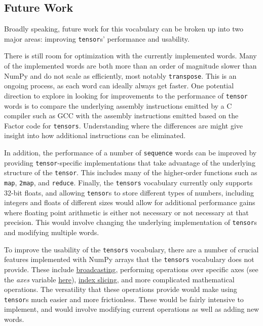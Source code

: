 \documentclass[
]{article}
\begin{document}
\hypertarget{future-work-2}{%
\subsection{Future Work}\label{future-work-2}}

Broadly speaking, future work for this vocabulary can be broken up into
two major areas: improving \texttt{tensor}s' performance and usability.

There is still room for optimization with the currently implemented
words. Many of the implemented words are both more than an order of
magnitude slower than NumPy and do not scale as efficiently, most
notably \texttt{transpose}. This is an ongoing process, as each word can
ideally always get faster. One potential direction
to explore in looking for improvements to the performance of
\texttt{tensor} words is to compare the underlying assembly instructions
emitted by a C compiler such as GCC with the assembly instructions
emitted based on the Factor code for \texttt{tensors}. Understanding
where the differences are might give insight into how additional
instructions can be eliminated.

In addition, the performance of a number of \texttt{sequence} words can
be improved by providing \texttt{tensor}-specific implementations that
take advantage of the underlying structure of the \texttt{tensor}. This
includes many of the higher-order functions such as \texttt{map},
\texttt{2map}, and \texttt{reduce}. Finally, the \texttt{tensors}
vocabulary currently only supports 32-bit floats, and allowing
\texttt{tensor}s to store different types of numbers, including integers
and floats of different sizes would allow for additional performance
gains where floating point arithmetic is either not necessary or not
necessary at that precision. This would involve changing the underlying
implementation of \texttt{tensor}s and modifying multiple words.

To improve the usability of the \texttt{tensors} vocabulary, there are a
number of crucial features implemented with NumPy arrays that the
\texttt{tensors} vocabulary does not provide. These include
\href{https://docs.scipy.org/doc/numpy/user/basics.broadcasting.html}{broadcasting},
performing operations over specific axes (see the \emph{axes} variable
\href{https://numpy.org/doc/stable/reference/generated/numpy.transpose.html}{here}),
\href{https://numpy.org/doc/stable/reference/arrays.indexing.html}{index
slicing}, and more complicated mathematical operations. The versatility
that these operations provide would make using \texttt{tensor}s much
easier and more frictionless. These would be fairly intensive to
implement, and would involve modifying current operations as well as
adding new words.
\end{document}

